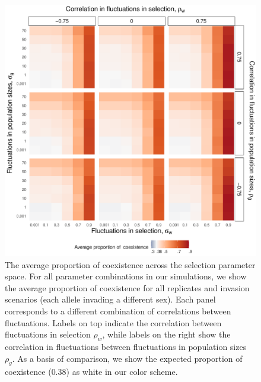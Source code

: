 \begin{figure}[H]
  \centerline{\includegraphics[width=1\textwidth]{heat_map.pdf}}
  \caption{The average proportion of coexistence across the selection parameter space. For all parameter combinations in our simulations, we show the average proportion of coexistence for all replicates and invasion scenarios (each allele invading a different sex). Each panel corresponds to a different combination of correlations between fluctuations. Labels on top indicate the correlation between fluctuations in selection $\rho_{w}$, while labels on the right show the correlation in fluctuations between fluctuations in population sizes $\rho_{g}$.  As a basis of comparison, we show the expected proportion of coexistence ($ 0.38$) as white in our color scheme.  }
    \label{fig:heatmap}
\end{figure}


\clearpage

